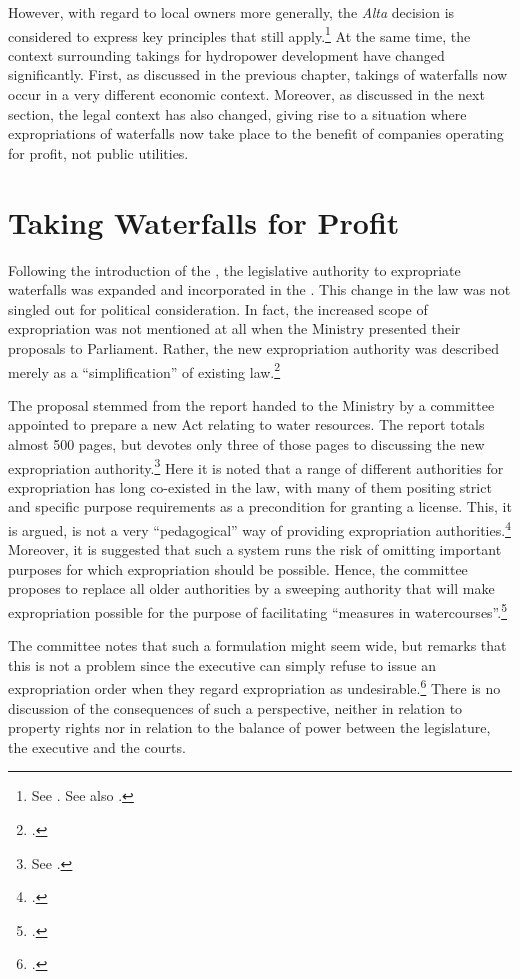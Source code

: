 However, with regard to local owners more generally, the {\it Alta} decision is considered to express key principles that still apply.\footnote{See \cite{jorpeland11}. See also \cite[312]{haagensen02}.} 
At the same time, the context surrounding takings for hydropower development have changed significantly. First, as discussed in the previous chapter, takings of waterfalls now occur in a very different economic context. Moreover, as discussed in the next section, the legal context has also changed, giving rise to a situation where expropriations of waterfalls now take place to the benefit of companies operating for profit, not public utilities.

\section{Taking Waterfalls for Profit}\label{sec:5:5}

Following the introduction of the \cite{wra00}, the legislative authority to expropriate waterfalls  was expanded and incorporated in the \cite{ea59}. This change in the law was not singled out for political consideration. In fact, the increased scope of expropriation was not mentioned at all when the Ministry presented their proposals to Parliament. Rather, the new expropriation authority was described merely as a ``simplification'' of existing law.\footcite[223-225]{otprp39}

The proposal stemmed from the report handed to the Ministry by a committee appointed to prepare a new Act relating to water resources. The report totals almost 500 pages, but devotes only three of those pages to discussing the new expropriation authority.\footnote{See \cite[235-237]{nou94}.} Here it is noted that a range of different authorities for expropriation has long co-existed in the law, with many of them positing strict and specific purpose requirements as a precondition for granting a license. This, it is argued, is not a very ``pedagogical'' way of providing expropriation authorities.\footcite[235]{nou94} Moreover, it is suggested that such a system runs the risk of omitting important purposes for which expropriation should be possible. Hence, the committee proposes to replace all older authorities by a sweeping authority that will make expropriation possible for the purpose of facilitating ``measures in watercourses''.\footcite[235-236]{nou94}

The committee notes that such a formulation might seem wide, but remarks that this is not a problem since the executive can simply refuse to issue an expropriation order when they regard expropriation as undesirable.\footcite[235]{nou94} There is no discussion of the consequences of such a perspective, neither in relation to property rights nor in relation to the balance of power between the legislature, the executive and the courts.

